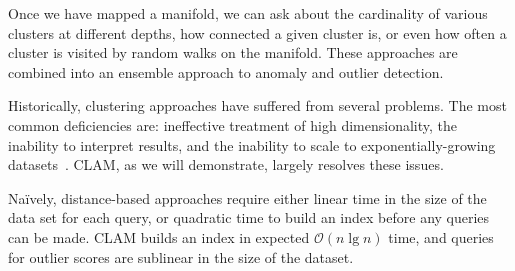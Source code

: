 Once we have mapped a manifold, we can ask about the cardinality of various clusters at different depths, how connected a given cluster is, or even how often a cluster is visited by random walks on the manifold.
These approaches are combined into an ensemble approach to anomaly and outlier detection.

Historically, clustering approaches have suffered from several problems.
The most common deficiencies are:
ineffective treatment of high dimensionality,
the inability to interpret results, and
the inability to scale to exponentially-growing datasets~\cite{agrawal1998automatic}.
CLAM, as we will demonstrate, largely resolves these issues.

Na\"ively, distance-based approaches require either linear time in the size of the data set for each query,
or quadratic time to build an index before any queries can be made.
CLAM builds an index in expected $\mathcal{O}(n \lg n)$ time, and queries for outlier scores are sublinear in the size of the dataset.
